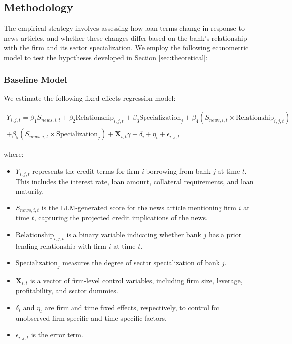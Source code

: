\subsection{Methodology}

The empirical strategy involves assessing how loan terms change in response to news articles, and whether these changes differ based on the bank's relationship with the firm and its sector specialization. We employ the following econometric model to test the hypotheses developed in Section \ref{sec:theoretical}:

\subsubsection{Baseline Model}

We estimate the following fixed-effects regression model:

\begin{align*}
Y_{i,j,t} 
= 
\beta_1 S_{news,i,t} 
+ 
\beta_2 \text{Relationship}_{i,j,t} 
+ 
\beta_3 \text{Specialization}_{j} 
+ 
\beta_4 \left(S_{news,i,t} \times \text{Relationship}_{i,j,t}\right) 
\\ + 
\beta_5 \left(S_{news,i,t} \times \text{Specialization}_{j}\right) 
+ 
\mathbf{X}_{i,t} \gamma 
+ 
\delta_i 
+ 
\eta_t 
+ 
\epsilon_{i,j,t}
\end{align*}

where:
\begin{itemize}
    \item $Y_{i,j,t}$ represents the credit terms for firm $i$ borrowing from bank $j$ at time $t$. This includes the interest rate, loan amount, collateral requirements, and loan maturity.
    \item $S_{news,i,t}$ is the LLM-generated score for the news article mentioning firm $i$ at time $t$, capturing the projected credit implications of the news.
    \item $\text{Relationship}_{i,j,t}$ is a binary variable indicating whether bank $j$ has a prior lending relationship with firm $i$ at time $t$.
    \item $\text{Specialization}_{j}$ measures the degree of sector specialization of bank $j$.
    \item $\mathbf{X}_{i,t}$ is a vector of firm-level control variables, including firm size, leverage, profitability, and sector dummies.
    \item $\delta_i$ and $\eta_t$ are firm and time fixed effects, respectively, to control for unobserved firm-specific and time-specific factors.
    \item $\epsilon_{i,j,t}$ is the error term.
\end{itemize}

